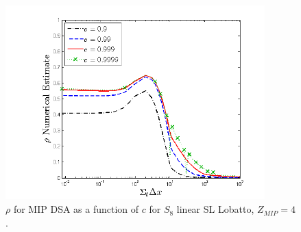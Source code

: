 %
%
\begin{figure}[!hbp]
\centering
\includegraphics[width=10cm]{chapter4_acceleration/Const_4_Constant_XS_c_comparions_MIP_Lobatto.png}
\caption{$\rho$ for MIP DSA as a function of $c$  for  $S_8$  linear SL Lobatto, $Z_{MIP}=4$.}
\label{fig:mip_lobatto_as_fun_c_z4}
\end{figure}
%
\pagebreak
%

